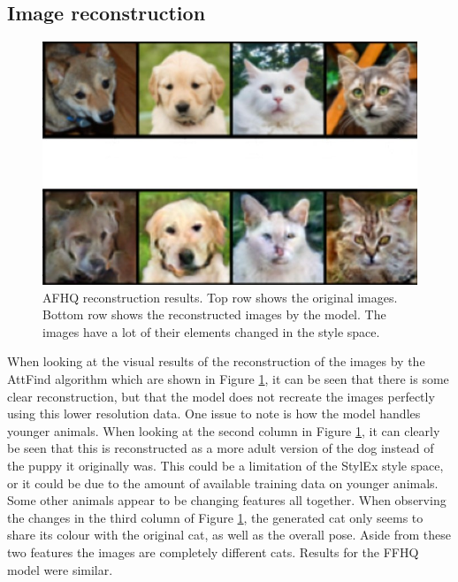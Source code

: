 \subsection{Image reconstruction}
\label{sec:claim1}

\begin{figure}
     \centering
     \includegraphics[scale=0.3]{images/Reconstruct_dogcat_crop.jpg}
     \caption{AFHQ reconstruction results. Top row shows the original images. Bottom row shows the reconstructed images by the model. The images have a lot of their elements changed in the style space.}
     \label{fig:Rec_Anim}
\end{figure}

When looking at the visual results of the reconstruction of the images by the AttFind algorithm which are shown in Figure \ref{fig:Rec_Anim}, it can be seen that there is some clear reconstruction, but that the model does not recreate the images perfectly using this lower resolution data. One issue to note is how the model handles younger animals. When looking at the second column in Figure \ref{fig:Rec_Anim}, it can clearly be seen that this is reconstructed as a more adult version of the dog instead of the puppy it originally was. This could be a limitation of the StylEx style space, or it could be due to the amount of available training data on younger animals. Some other animals appear to be changing features all together. When observing the changes in the third column of Figure \ref{fig:Rec_Anim}, the generated cat only seems to share its colour with the original cat, as well as the overall pose. Aside from these two features the images are completely different cats. Results for the FFHQ model were similar.





